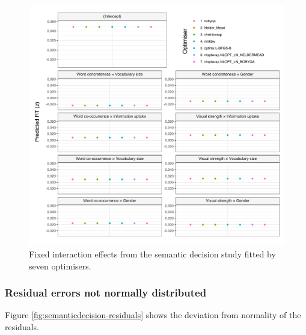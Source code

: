 \documentclass[
  12pt,
  man,floatsintext]{apa7}
\begin{document}
\begin{figure}

{\centering \includegraphics[width=1\linewidth]{../semanticdecision/frequentist_analysis/model_diagnostics/plots/interactions_semanticdecision_allFit_convergence} 

}

\caption{Fixed interaction effects from the semantic decision study fitted by seven optimisers.}\label{fig:interactions-semanticdecision-allFit-convergence}
\end{figure}

\hypertarget{residual-errors-not-normally-distributed-3}{%
\subsubsection{Residual errors not normally distributed}\label{residual-errors-not-normally-distributed-3}}

Figure \ref{fig:semanticdecision-residuals} shows the deviation from normality of the residuals.
\end{document}
